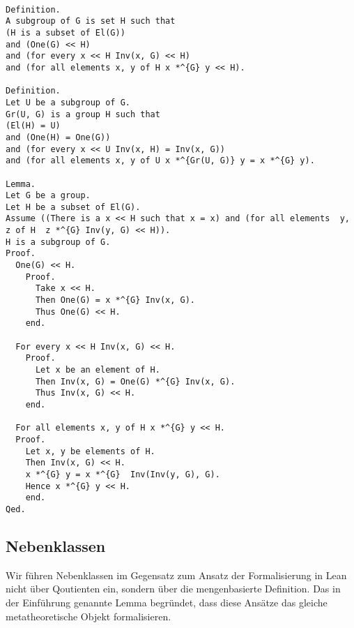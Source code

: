 \documentclass[a4paper,12pt]{scrartcl}
\begin{document}
\begin{lstlisting}

Definition.
A subgroup of G is set H such that
(H is a subset of El(G))
and (One(G) << H)
and (for every x << H Inv(x, G) << H)
and (for all elements x, y of H x *^{G} y << H).

Definition.
Let U be a subgroup of G.
Gr(U, G) is a group H such that
(El(H) = U)
and (One(H) = One(G))
and (for every x << U Inv(x, H) = Inv(x, G))
and (for all elements x, y of U x *^{Gr(U, G)} y = x *^{G} y).

Lemma.
Let G be a group.
Let H be a subset of El(G).
Assume ((There is a x << H such that x = x) and (for all elements  y, z of H  z *^{G} Inv(y, G) << H)).
H is a subgroup of G.
Proof.
  One(G) << H.
    Proof.
      Take x << H.
      Then One(G) = x *^{G} Inv(x, G).
      Thus One(G) << H.
    end.

  For every x << H Inv(x, G) << H.
    Proof.
      Let x be an element of H.
      Then Inv(x, G) = One(G) *^{G} Inv(x, G).
      Thus Inv(x, G) << H.
    end.

  For all elements x, y of H x *^{G} y << H.
  Proof.
    Let x, y be elements of H.
    Then Inv(x, G) << H.
    x *^{G} y = x *^{G}  Inv(Inv(y, G), G).
    Hence x *^{G} y << H.
    end.
Qed.

\end{lstlisting}

\subsection{Nebenklassen}

Wir führen Nebenklassen im Gegensatz zum Ansatz der Formalisierung in Lean nicht über Qoutienten ein, sondern über die mengenbasierte Definition.
Das in der Einführung genannte Lemma begründet, dass diese Ansätze das gleiche metatheoretische Objekt formalisieren.
\end{document}
